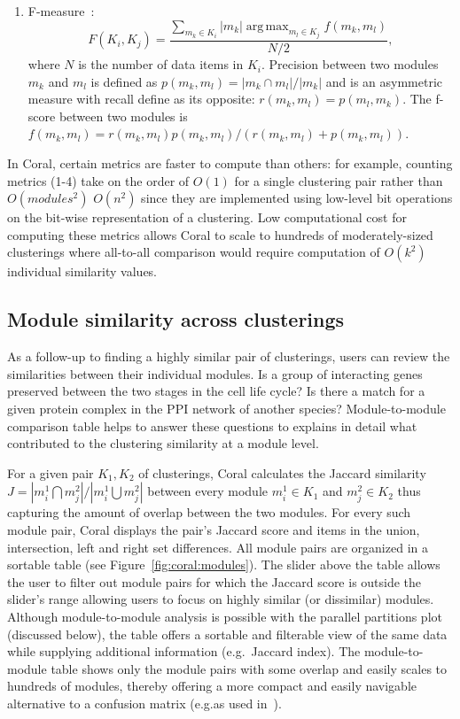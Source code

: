 \documentclass[12pt]{cmuthesis}
\makeatletter
\newcommand\Coral{Coral\xspace}
\newcommand{\eg}{e.g.\@}
\DeclareMathOperator*{\argmax}{arg\,max}
\makeatother
\begin{document}
\begin{enumerate}
    \item F-measure~\cite{Meila2003}:
    \[
    F(K_i,K_j) = \frac{ \sum_{m_k \in K_i} |m_k| \argmax_{m_l \in K_j} f(m_k, m_l) }{N/2},
    \]
    where $N$ is the number of data items in $K_i$. Precision between two modules $m_k$ and $m_l$ is defined as $p(m_k, m_l) = |m_k \cap m_l| / |m_k|$ and is an asymmetric measure with recall define as its opposite: $r(m_k, m_l) = p(m_l, m_k)$. The f-score between two modules is $f(m_k,m_l) = r(m_k, m_l) p(m_k, m_l) / ( r(m_k, m_l) + p(m_k, m_l) )$.

  \end{enumerate}

  In \Coral, certain metrics are faster to compute than others: for example, counting metrics (1-4) take on the order of $O(1)$ for a single clustering pair rather than $O(modules^2)$ $O(n^2)$ since they are implemented using low-level bit operations on the bit-wise representation of a clustering. Low computational cost for computing these metrics allows Coral to scale to hundreds of moderately-sized clusterings where all-to-all comparison would require computation of $O(k^2)$ individual similarity values.

  \subsection{Module similarity across clusterings}
  \label{sec:modules}

  As a follow-up to finding a highly similar pair of clusterings, users can review the similarities between their individual modules. Is a group of interacting genes preserved between the two stages in the cell life cycle? Is there a match for a given protein complex in the PPI network of another species? Module-to-module comparison table helps to answer these questions to explains in detail what contributed to the clustering similarity at a  module level.

  For a given pair $K_1, K_2$ of clusterings, \Coral calculates the Jaccard similarity $J = |m^{1}_{i} \bigcap m^{2}_{j}| / |m^{1}_{i} \bigcup m^{2}_{j} |$ between every module $m^{1}_{i} \in K_1$ and $m^{2}_{j} \in K_2$ thus capturing the amount of overlap between the two modules. For every such module pair, \Coral displays the pair's Jaccard score and items in the union, intersection, left and right set differences. All module pairs are organized in a sortable table (see Figure~\ref{fig:coral:modules}). The slider above the table allows the user to filter out module pairs for which the Jaccard score is outside the slider's range allowing users to focus on highly similar (or dissimilar) modules. Although module-to-module analysis is possible with the parallel partitions plot (discussed below), the table offers a sortable and filterable view of the same data while supplying additional information (\eg~Jaccard index). The module-to-module table shows only the module pairs with some overlap and easily scales to hundreds of modules, thereby offering a more compact and easily navigable alternative to a confusion matrix (\eg\@ as used in~\cite{Langfelder2011}).
\end{document}
